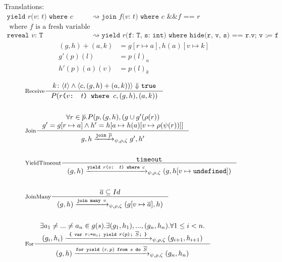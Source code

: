 \documentclass[acmsmall,review,anonymous]{acmart}\settopmatter{printfolios=true,printccs=false,printacmref=false}
\begin{document}
Translations:
\begin{align*}
  \texttt{yield $r$($v$: $t$) where $c$} & \rightsquigarrow \texttt{join $f$($v$: $t$) where $c$ \&\& $f$ == $r$}\\
  \text{ where $f$ is a fresh variable}. \\
  \texttt{reveal $v$: T}                 & \rightsquigarrow \texttt{yield $r$(f: T, s: int) where hide(r, v, s) == r.v; v := f}.
\end{align*}
\newcommand{\step}[3]{#2 \xrightarrow{\texttt{#1}}_{\psi, \rho, \zeta} #3}
\begin{align*}
  & (g, h) + (a, k) &= g[r \mapsto a], h(a)[v \mapsto k]\\
  & g'(p)(l) &= p(l)_a  \\
  & h'(p)(a)(v) &= p(l)_k \\
\end{align*}
\begin{align*}
  &\inference[Receive]{
    k \colon \langle t \rangle \land \langle c, (g, h) + (a, k)) \rangle \Downarrow \texttt{true}
  }{
    P(\texttt{$r$($v$: $t$) where $c$}, (g, h), (a, k))
  }\\ \\ 
  &\inference[Join]{
    \forall r \in \overline p . P(p, (g, h), (g \cup g'(\rho(r)) \\
    g' = g[r \mapsto a] \land h' = h[a \mapsto h(a)[v \mapsto \rho(\psi(r))]]
  }{
    \step {join $\overline p$} {g, h} {g', h'}
  }\\ \\
  &\inference[YieldTimeout]{
    \texttt{timeout}
  }{
    \step{yield $r$($v$: $t$) where $c$}{(g, h)}{(g, h[v \mapsto \texttt{undefined}])}
  }\\ \\
  &\inference[JoinMany]{
    \overline{a} \subseteq Id
  }{
    \step{join many $v$}{(g, h)}{(g[v \mapsto \overline{a}], h)}
  }\\ \\
  &\inference[For]{
    \exists a_1 \neq ... \neq a_n \in g(s) . \exists (g_1, h_1), ..., (g_n, h_n) . \forall 1 \leq i < n . \\
    \step{ \{ var $r$:=$a_i$; yield $r$($p$); $\overline{S}$; \} }{(g_i, h_i)}{(g_{i+1}, h_{i+1})}
  }{
    \step{for yield $(r, p)$ from $s$ do $\overline{S}$}{(g, h)}{(g_n, h_n)}
  }\\
\end{align*}


\vfill
\pagebreak
\end{document}
